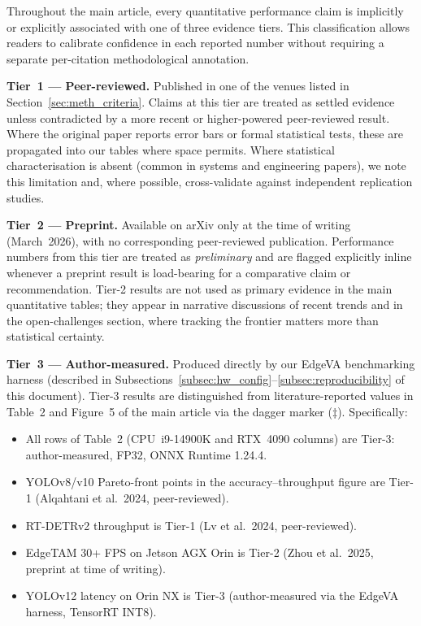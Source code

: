 \documentclass[11pt,a4paper]{article}
\begin{document}
Throughout the main article, every quantitative performance claim is
implicitly or explicitly associated with one of three evidence tiers.
This classification allows readers to calibrate confidence in each
reported number without requiring a separate per-citation methodological
annotation.

\medskip
\noindent\textbf{Tier~1 --- Peer-reviewed.}
Published in one of the venues listed in Section~\ref{sec:meth_criteria}.
Claims at this tier are treated as settled evidence unless contradicted
by a more recent or higher-powered peer-reviewed result. Where the
original paper reports error bars or formal statistical tests, these
are propagated into our tables where space permits. Where statistical
characterisation is absent (common in systems and engineering papers),
we note this limitation and, where possible, cross-validate against
independent replication studies.

\medskip
\noindent\textbf{Tier~2 --- Preprint.}
Available on arXiv only at the time of writing (March~2026), with no
corresponding peer-reviewed publication. Performance numbers from this
tier are treated as \emph{preliminary} and are flagged explicitly inline
whenever a preprint result is load-bearing for a comparative claim or
recommendation. Tier-2 results are not used as primary evidence in the
main quantitative tables; they appear in narrative discussions of
recent trends and in the open-challenges section, where tracking the
frontier matters more than statistical certainty.

\medskip
\noindent\textbf{Tier~3 --- Author-measured.}
Produced directly by our EdgeVA benchmarking harness (described in
Subsections~\ref{subsec:hw_config}--\ref{subsec:reproducibility} of this
document). Tier-3 results are distinguished from literature-reported
values in Table~2 and Figure~5 of the main article via the dagger
marker ($\ddagger$). Specifically:

\begin{itemize}[leftmargin=*, noitemsep]
  \item All rows of Table~2 (CPU~i9-14900K and RTX~4090 columns) are
    Tier-3: author-measured, FP32, ONNX Runtime 1.24.4.
  \item YOLOv8/v10 Pareto-front points in the accuracy--throughput figure
    are Tier-1 (Alqahtani et al.\ 2024, peer-reviewed).
  \item RT-DETRv2 throughput is Tier-1 (Lv et al.\ 2024, peer-reviewed).
  \item EdgeTAM 30+ FPS on Jetson AGX Orin is Tier-2 (Zhou et al.\
    2025, preprint at time of writing).
  \item YOLOv12 latency on Orin NX is Tier-3 (author-measured via the
    EdgeVA harness, TensorRT INT8).
\end{itemize}
\end{document}

